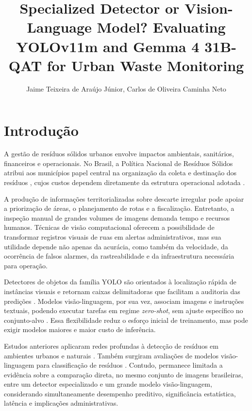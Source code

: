 \documentclass[kdmile,a4paper]{kdmile}
\title{Specialized Detector or Vision-Language Model? Evaluating YOLOv11m and Gemma 4 31B-QAT for Urban Waste Monitoring}
\author{Jaime Teixeira de Araújo Júnior\inst{1}, Carlos de Oliveira Caminha Neto\inst{1}}
\institute{Universidade Federal do Ceará -- Fortaleza -- CE -- Brasil\\
  \email{jaimejrs@alu.ufc.br, carlos.o.c.neto@gmail.com}
}
\begin{document}
\begin{bottomstuff}
\end{bottomstuff}

\maketitle

\section{Introdução}
\label{sec:introducao}

A gestão de resíduos sólidos urbanos envolve impactos ambientais, sanitários, financeiros e operacionais. No Brasil, a Política Nacional de Resíduos Sólidos atribui aos municípios papel central na organização da coleta e destinação dos resíduos \cite{Brasil2010}, cujos custos dependem diretamente da estrutura operacional adotada \cite{Rodrigues2016}.

A produção de informações territorializadas sobre descarte irregular pode apoiar a priorização de áreas, o planejamento de rotas e a fiscalização. Entretanto, a inspeção manual de grandes volumes de imagens demanda tempo e recursos humanos. Técnicas de visão computacional oferecem a possibilidade de transformar registros visuais de ruas em alertas administrativos, mas sua utilidade depende não apenas da acurácia, como também da velocidade, da ocorrência de falsos alarmes, da rastreabilidade e da infraestrutura necessária para operação.

Detectores de objetos da família YOLO são orientados à localização rápida de instâncias visuais e retornam caixas delimitadoras que facilitam a auditoria das predições \cite{Redmon2016,Terven2023}. Modelos visão-linguagem, por sua vez, associam imagens e instruções textuais, podendo executar tarefas em regime \emph{zero-shot}, sem ajuste específico no conjunto-alvo \cite{Radford2021,Zhang2024}. Essa flexibilidade reduz o esforço inicial de treinamento, mas pode exigir modelos maiores e maior custo de inferência.

Estudos anteriores aplicaram redes profundas à detecção de resíduos em ambientes urbanos e naturais \cite{Cordova2022,Majchrowska2022}. Também surgiram avaliações de modelos visão-linguagem para classificação de resíduos \cite{Funk2025,Malla2026}. Contudo, permanece limitada a evidência sobre a comparação direta, no mesmo conjunto de imagens brasileiras, entre um detector especializado e um grande modelo visão-linguagem, considerando simultaneamente desempenho preditivo, significância estatística, latência e implicações administrativas.
\end{document}
